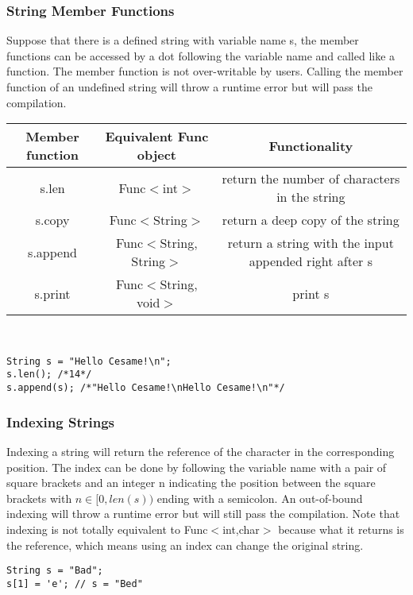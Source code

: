\subsubsection{String Member Functions}
Suppose that there is a defined string with variable name s, the member functions can be accessed by a dot following the variable name and called like a function. The member function is not over-writable by users. Calling the member function of an undefined string will throw a runtime error but will pass the compilation.
\begin{table}[h]
    \centering
    \setlength{\arrayrulewidth}{0.3mm}
    \renewcommand{\arraystretch}{1.2}
    \begin{tabular}{ccc}
        \toprule
        Member function & Equivalent Func object & Functionality \\
        \midrule
        s.len & Func$<$int$>$ & return the number of characters in the string \\
        \arrayrulecolor{gray!50}\cmidrule(lr){1-3}\arrayrulecolor{black}
        s.copy & Func$<$String$>$ & return a deep copy of the string \\
        
        \arrayrulecolor{gray!50}\cmidrule(lr){1-3}\arrayrulecolor{black}
        s.append & Func$<$String, String$>$ & return a string with the input appended right after s \\
        \arrayrulecolor{gray!50}\cmidrule(lr){1-3}\arrayrulecolor{black}
        s.print & Func$<$String, void$>$ & print s \\
        \bottomrule
    \end{tabular}
\end{table}  \\
\begin{lstlisting}[caption={string\_member\_function.csm}, captionpos=b]
String s = "Hello Cesame!\n";
s.len(); /*14*/
s.append(s); /*"Hello Cesame!\nHello Cesame!\n"*/
\end{lstlisting}
\subsubsection{Indexing Strings}
Indexing a string will return the reference of the character in the corresponding position. The index can be done by following the variable name with a pair of square brackets and an integer n indicating the position between the square brackets with $n \in [0, len(s))$ ending with a semicolon. An out-of-bound indexing will throw a runtime error but will still pass the compilation. Note that indexing is not totally equivalent to Func$<$int,char$>$ because what it returns is the reference, which means using an index can change the original string.
\begin{lstlisting}[caption={indexing\_string.csm}, captionpos=b]
String s = "Bad";
s[1] = 'e'; // s = "Bed"
\end{lstlisting}
